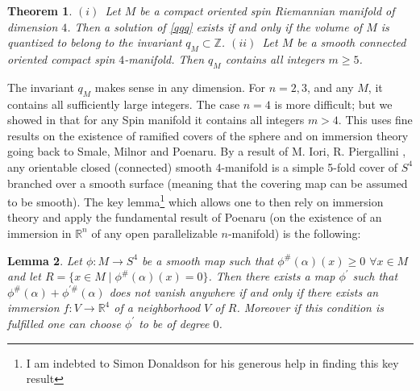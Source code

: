 \documentclass[12pt]{article}
\newtheorem{thm}{Theorem}[section]
\newtheorem{lem}[thm]{Lemma}
\def\R{{\mathbb R}}
\begin{document}
\begin{thm}\label{emerge}
$(i)$~Let $M$ be a compact oriented spin Riemannian manifold of dimension
$4$. Then a solution of \eqref{qqq} exists if and only if the volume of $M$ is
quantized to belong to the invariant $q_{M}\subset\mathbb{Z}$.\newline
$(ii)$~Let $M$ be a smooth connected oriented compact spin $4$-manifold.
Then  $q_M$ contains all integers $m\geq5$.		
\end{thm}
 The invariant $q_{M}$ makes sense in any dimension. For $n=2,3$, and any $M$,
it contains all sufficiently large integers. The case $n=4$ is more difficult;
but we showed in \cite{acmu2} that for any Spin manifold it contains all integers $m>4$.
This uses fine results on the existence of ramified covers of the sphere and on
immersion theory going back to Smale, Milnor and Poenaru.
By a result of M. Iori, R. Piergallini \cite{piergallini},
any orientable closed (connected) smooth 4-manifold is a simple
5-fold cover of $S^4$ branched over a smooth surface (meaning that the covering map can
be assumed to be smooth).
The key lemma\footnote{I am indebted to Simon Donaldson for his generous help in finding this key result} which allows one to then rely on immersion theory and apply the fundamental result of Poenaru \cite{Poenaru} (on the existence of an immersion in $\R^n$ of any open parallelizable $n$-manifold) is the following:
\begin{lem}
Let $\phi:M\to S^{4}$ be a smooth map such that $\phi
^{\#}(\alpha)(x)\geq0$ $\forall x\in M$ and let $R=\{x\in M\mid\phi^{\#}
(\alpha)(x)=0\}$. Then there exists a map $\phi^{\prime}$ such that $\phi
^{\#}(\alpha)+\phi^{\prime\#}(\alpha)$ does not vanish anywhere if and only if
there exists an immersion $f:V\to\mathbb{R}^{4}$ of a neighborhood $V$ of $R$.
Moreover if this condition is fulfilled one can choose $\phi^{\prime}$ to be
of degree $0$.	
\end{lem}
\end{document}

